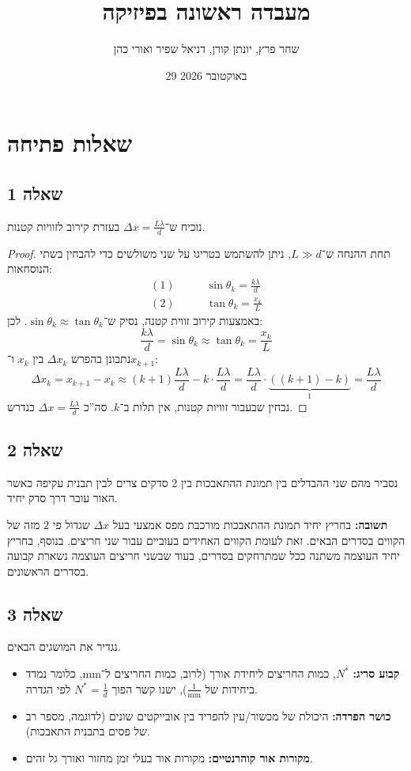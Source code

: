 \documentclass[]{../../../tex/classes/styledArticle}
\author{שחר פרץ, יונתן קורן, דניאל שפיר ואורי כהן}
\title{מעבדה ראשונה בפיזיקה}
\date{29 באוקטובר 2026}
\renewcommand\lg{\lambda}
\begin{document}
	\maketitle
	
	\section{שאלות פתיחה}
	\subsection{שאלה 1}
	נוכיח ש־$\Delta x = \frac{L \lg}{d}$ בעזרת קירוב לזוויות קטנות. 
	\begin{proof}
		תחת ההנחה ש־$L \gg d$, ניתן להשתמש בטריגו על שני משולשים כדי להבחין בשתי הנוסחאות: 
		\begin{align*}
			(1)&\quad\quad\sin \theta_k = \frac{k \lg}{d} \\
			(2)&\quad\quad\tan \theta_k = \frac{x_k}{L}
		\end{align*}
		באמצעות קירוב זווית קטנה, נסיק ש־$\sin \theta_k \approx \tan \theta_k$. לכן: 
		\[ \frac{k\lg}{d} = \sin \theta_k \approx \tan \theta_k = \frac{x_k}{L} \]
		נתבונן בהפרש $\Delta x_k$ בין $x_k$ ו־$x_{k +1}$: 
		\[ \Delta x_k = x_{k + 1} - x_k \approx (k + 1)\frac{L\lg}{d} - k \cdot \frac{L\lg}{d} = \frac{L\lg }{d}\cdot\underbrace{((k + 1) - k)}_1 = \frac{L\lg}{d}  \]
		נבחין שבעבור זוויות קטנות, אין תלות ב־$k$. סה''כ $\Delta x = \frac{L \lg }{d}$ כנדרש. 
	\end{proof}
	
	\subsection{שאלה 2}
	נסביר מהם שני ההבדלים בין תמונת ההתאבכות בין 2 סדקים צרים לבין תבנית עקיפה כאשר האור עובר דרך סדק יחיד. 
	
	\textbf{תשובה: }בחריץ יחיד תמונת ההתאבכות מורכבת מפס אמצעי בעל $\Delta x$ שגדול פי 2 מזה של הקווים בסדרים הבאים. זאת לעומת הקווים האחידים בעוביים עבור שני חריצים. בנוסף, בחריץ יחיד העוצמה משתנה ככל שמתרחקים בסדרים, בעוד שבשני חריצים העוצמה נשארת קבועה בסדרים הראשונים. 
	\subsection{שאלה 3}
	נגדיר את המושגים הבאים. 
	\begin{itemize}
		\item \textbf{קבוע סריג: }$N^*$, כמות החריצים ליחידת אורך (לרוב, כמות החריצים ל־$\mathrm{mm}$, כלומר נמדד ביחידות של $\frac{1}{\mathrm{mm}}$), ישנו קשר הפוך $N^* = \frac{1}{d}$ לפי הגדרה. 
		\item \textbf{כושר הפרדה: }היכולת של מכשור/עין להפריד בין אובייקטים שונים (לדוגמה, מספר רב של פסים בתבנית התאבכות). 
		\item \textbf{מקורות אור קוהרנטיים: }מקורות אור בעלי זמן מחזור ואורך גל זהים. 
	\end{itemize}
	
\end{document}
